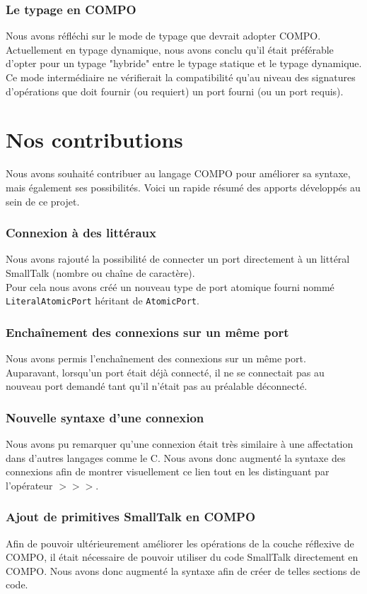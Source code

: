 \documentclass[11pt,a4paper,openany,oneside]{book}
\begin{document}
\subsubsection{Le typage en COMPO}
Nous avons réfléchi sur le mode de typage que devrait adopter COMPO. Actuellement en typage dynamique, nous avons conclu qu'il était préférable d'opter pour un typage "hybride" entre le typage statique et le typage dynamique. Ce mode intermédiaire ne vérifierait la compatibilité qu'au niveau des signatures d'opérations que doit fournir (ou requiert) un port fourni (ou un port requis).

\section{Nos contributions}

Nous avons souhaité contribuer au langage COMPO pour améliorer sa syntaxe, mais également ses possibilités. Voici un rapide résumé des apports développés au sein de ce projet.

\subsubsection{Connexion à des littéraux}
Nous avons rajouté la possibilité de connecter un port directement à un littéral SmallTalk (nombre ou chaîne de caractère).\\
Pour cela nous avons créé un nouveau type de port atomique fourni nommé \texttt{LiteralAtomicPort} héritant de \texttt{AtomicPort}.

\subsubsection{Enchaînement des connexions sur un même port}
Nous avons permis l'enchaînement des connexions sur un même port. Auparavant, lorsqu'un port était déjà connecté, il ne se connectait pas au nouveau port demandé tant qu'il n'était pas au préalable déconnecté.

\subsubsection{Nouvelle syntaxe d'une connexion}
Nous avons pu remarquer qu'une connexion était très similaire à une affectation dans d'autres langages comme le C. Nous avons donc augmenté la syntaxe des connexions afin de montrer visuellement ce lien tout en les distinguant par l'opérateur $>>>$.

\subsubsection{Ajout de primitives SmallTalk en COMPO}
Afin de pouvoir ultérieurement améliorer les opérations de la couche réflexive de COMPO, il était nécessaire de pouvoir utiliser du code SmallTalk directement en COMPO. Nous avons donc augmenté la syntaxe afin de créer de telles sections de code.
\end{document}
